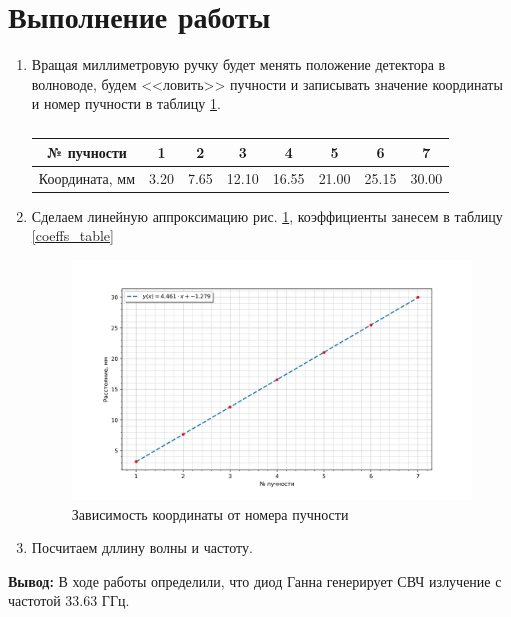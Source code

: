 \documentclass[a4paper]{article}
\begin{document}
\section{Выполнение работы}

\begin{enumerate}
   
\item Вращая миллиметровую ручку будет менять положение детектора в волноводе, будем <<ловить>> пучности и записывать значение координаты 
и номер пучности в таблицу \ref{t1}. 

\begin{table}[H]
    \begin{center}
        \begin{tabular}{|c|c|c|c|c|c|c|c|}
            \hline
            № пучности & 1& 2 & 3& 4&5&6&7 \\ \hline
            Координата, мм & 3.20&7.65&12.10&16.55&21.00&25.15&30.00 \\ \hline
        \end{tabular}
        \caption{}
        \label{t1}
    \end{center}
\end{table}

\item Сделаем линейную аппроксимацию рис. \ref{p1}, коэффициенты занесем в таблицу \ref{coeffs_table}



\begin{figure}[H]
    \begin{center}
        \includegraphics[scale = 0.7]{gr1.png}
        \caption{Зависимость координаты от номера пучности}
        \label{p1}
    \end{center}
\end{figure}

\item Посчитаем дллину волны и частоту. 

\begin{center}
\end{center}

\begin{center}
\end{center}

\end{enumerate}


\textbf{Вывод:} В ходе работы определили, что диод Ганна генерирует СВЧ излучение с частотой 33.63 ГГц.
\end{document}
